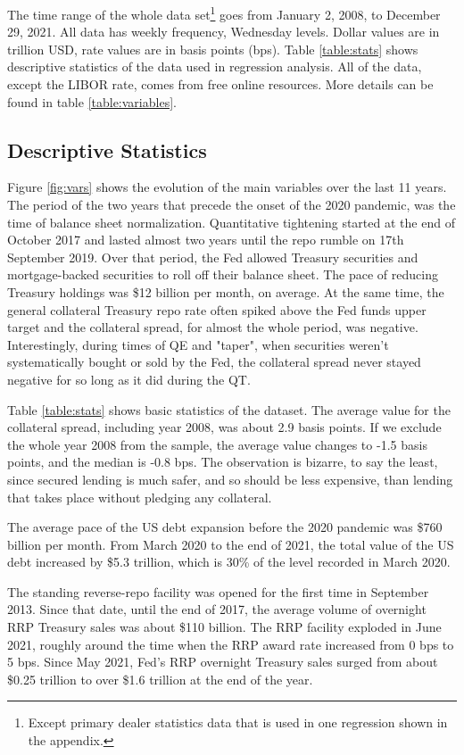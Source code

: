 \documentclass[11pt,a4paper,english,oneside]{article}
\begin{document}
The time range of the whole data set\footnote{Except primary dealer statistics data that is used in one regression shown in the appendix.} goes from January 2, 2008, to December 29, 2021. All data has weekly frequency, Wednesday levels. Dollar values are in trillion USD, rate values are in basis points (bps). Table \ref{table:stats} shows descriptive statistics of the data used in regression analysis. All of the data, except the LIBOR rate, comes from free online resources. More details can be found in table \ref{table:variables}.

\subsection{Descriptive Statistics} \label{sec:stats}

Figure \ref{fig:vars} shows the evolution of the main variables over the last 11 years. The period of the two years that precede the onset of the 2020 pandemic, was the time of balance sheet normalization. Quantitative tightening started at the end of October 2017 and lasted almost two years until the repo rumble on 17th September 2019. Over that period, the Fed allowed Treasury securities and mortgage-backed securities to roll off their balance sheet. The pace of reducing Treasury holdings was \$12 billion per month, on average. At the same time, the general collateral Treasury repo rate often spiked above the Fed funds upper target and the collateral spread, for almost the whole period, was negative. Interestingly, during times of QE and "taper", when securities weren't systematically bought or sold by the Fed, the collateral spread never stayed negative for so long as it did during the QT.

Table \ref{table:stats} shows basic statistics of the dataset. The average value for the collateral spread, including year 2008, was about 2.9 basis points. If we exclude the whole year 2008 from the sample, the average value changes to -1.5 basis points, and the median is -0.8 bps. The observation is bizarre, to say the least, since secured lending is much safer, and so should be less expensive, than lending that takes place without pledging any collateral.

The average pace of the US debt expansion before the 2020 pandemic was \$760 billion per month. From March 2020 to the end of 2021, the total value of the US debt increased by \$5.3 trillion, which is 30\% of the level recorded in March 2020.

The standing reverse-repo facility was opened for the first time in September 2013. Since that date, until the end of 2017, the average volume of overnight RRP Treasury sales was about \$110 billion. The RRP facility exploded in June 2021, roughly around the time when the RRP award rate increased from 0 bps to 5 bps. Since May 2021, Fed's RRP overnight Treasury sales surged from about \$0.25 trillion to over \$1.6 trillion at the end of the year.
\end{document}

